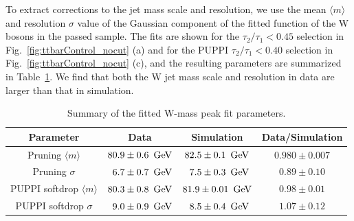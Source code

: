 To extract corrections to the jet mass scale and resolution, we use the
mean $\langle m \rangle$ and resolution $\sigma$ value of the Gaussian
component of the fitted function of the W bosons in the passed
sample.
The fits are shown for the
$\tau_2 / \tau_1 < 0.45$ selection in Fig.~\ref{fig:ttbarControl_nocut} (a) and for the
PUPPI $\tau_2 / \tau_1 < 0.40$ selection in Fig.~\ref{fig:ttbarControl_nocut} (c), and the
resulting parameters are summarized in Table~\ref{tab:params}.  We find
that both the W jet mass scale and resolution in data are larger than
that in simulation.

\begin{table}[!htb]
 \begin{center}
\caption{Summary of the fitted W-mass peak fit parameters.}
\label{tab:params}
 \begin{tabular}{c|c|c|c}
  Parameter & Data & Simulation & Data/Simulation \\
  \hline
  Pruning $\langle m \rangle$ &$80.9 \pm 0.6~{\rm \,\text{Ge\hspace{-.08em}V}}$ & $82.5 \pm 0.1~{\rm \,\text{Ge\hspace{-.08em}V}}$ & $0.980 \pm 0.007$ \\
  Pruning $\sigma$ & \ $6.7 \pm 0.7~{\rm \,\text{Ge\hspace{-.08em}V}}$ & \ $7.5 \pm 0.3~{\rm \,\text{Ge\hspace{-.08em}V}}$ & $0.89 \pm 0.10$ \\
  \hline
  PUPPI softdrop $\langle m \rangle$ &$80.3 \pm 0.8~{\rm \,\text{Ge\hspace{-.08em}V}}$ & $81.9 \pm 0.01~{\rm \,\text{Ge\hspace{-.08em}V}}$ & $0.98 \pm 0.01$ \\%
  PUPPI softdrop $\sigma$ & \ $9.0 \pm 0.9~{\rm \,\text{Ge\hspace{-.08em}V}}$ & \ $8.5 \pm 0.4~{\rm \,\text{Ge\hspace{-.08em}V}}$ & $1.07 \pm 0.12$ \\%
 \end{tabular}
 \end{center}
\end{table}




